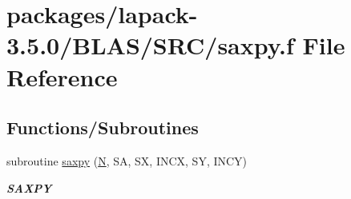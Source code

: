 \hypertarget{lapack-3_85_80_2BLAS_2SRC_2saxpy_8f}{}\section{packages/lapack-\/3.5.0/\+B\+L\+A\+S/\+S\+R\+C/saxpy.f File Reference}
\label{lapack-3_85_80_2BLAS_2SRC_2saxpy_8f}
\subsection*{Functions/\+Subroutines}
\begin{DoxyCompactItemize}
\item 
subroutine \hyperlink{group__single__blas__level1_gad2a52de0e32a6fc111931ece9b39726c}{saxpy} (\hyperlink{polmisc_8c_a0240ac851181b84ac374872dc5434ee4}{N}, S\+A, S\+X, I\+N\+C\+X, S\+Y, I\+N\+C\+Y)
\begin{DoxyCompactList}\small\item\em {\bfseries S\+A\+X\+P\+Y} \end{DoxyCompactList}\end{DoxyCompactItemize}
